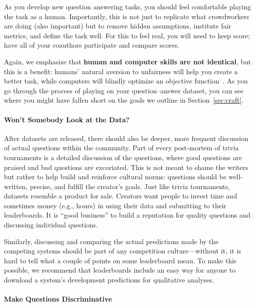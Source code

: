 As you develop new question answering tasks, you should feel comfortable playing the task as a human.
Importantly, this is not just to replicate what crowdworkers are doing (also important) but to remove hidden assumptions, institute fair metrics, and define the task well.
For this to feel real, you will need to keep score; have all of your coauthors participate and compare scores.

Again, we emphasize that {\bf human and computer skills are not
  identical}, but this is a benefit: humans' natural aversion to
unfairness will help you create a better task, while computers will
blindly optimize an objective function~\cite{bostrom-03}.
As you go through the process of playing on your question--answer dataset, you can see where you might have fallen short on the goals we outline in Section~\ref{sec:craft}.

\paragraph{Won't Somebody Look at the Data?}

After  datasets are released, there should also be deeper, more frequent discussion of actual questions within the  community.
Part of every post-mortem of trivia tournaments is a detailed discussion of the questions, where good questions are praised and bad questions are excoriated.
This is not meant to shame the writers but rather to help build and reinforce cultural norms: questions should be well-written, precise, and fulfill the creator's goals.
Just like trivia tournaments,  datasets resemble a product for sale.
Creators want people to invest time and sometimes money (e.g.,  hours) in using their data and submitting to their leaderboards.
It is ``good business'' to build a reputation for quality questions and discussing individual questions.

Similarly, discussing and comparing the actual predictions made by the competing systems should be part of
any competition culture---without it, it is hard to tell what a couple of points
on some leaderboard mean.  To make this possible, we recommend that leaderboards include an
easy way for anyone to download a system's development predictions for qualitative analyses.

\paragraph{Make Questions Discriminative}

